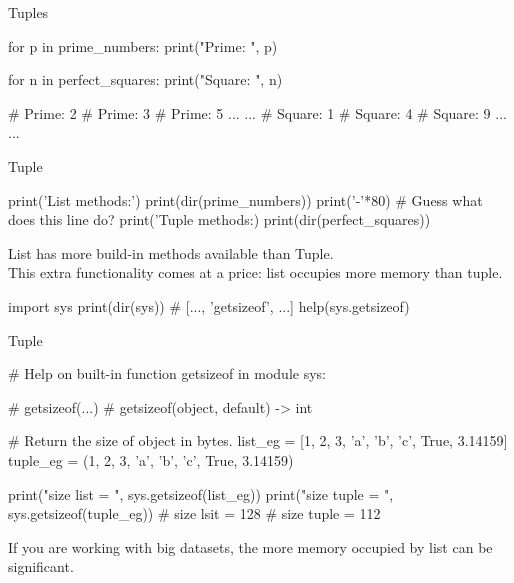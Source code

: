 \documentclass{beamer}
\begin{document}
\begin{frame}[fragile]{Tuples}
\begin{pythoncode}
for p in prime_numbers:
    print("Prime: ", p)

for n in perfect_squares:
    print("Square: ", n)

# Prime: 2
# Prime: 3
# Prime: 5
... ...
# Square: 1
# Square: 4
# Square: 9
... ...
\end{pythoncode}
\end{frame}

\begin{frame}[fragile]{Tuple}
\begin{pythoncode}
print('List methods:')
print(dir(prime_numbers))
print('-'*80)  # Guess what does this line do?
print('Tuple methods:)
print(dir(perfect_squares))
\end{pythoncode}
List has more build-in methods available than Tuple.\\
This extra functionality comes at a price: list occupies more
memory than tuple.\\
\begin{pythoncode}
import sys
print(dir(sys))
# [..., 'getsizeof', ...]
help(sys.getsizeof)
\end{pythoncode}
\end{frame}

\begin{frame}[fragile]{Tuple}
\begin{pythoncode}
# Help on built-in function getsizeof in module sys:

# getsizeof(...)
#     getsizeof(object, default) -> int
      
#     Return the size of object in bytes.
list_eg = [1, 2, 3, 'a', 'b', 'c', True, 3.14159]
tuple_eg = (1, 2, 3, 'a', 'b', 'c', True, 3.14159)

print("size list = ", sys.getsizeof(list_eg))
print("size tuple = ", sys.getsizeof(tuple_eg))
# size lsit = 128
# size tuple = 112
\end{pythoncode}
If you are working with big datasets, the more memory 
occupied by list can be significant.
\end{frame}
\end{document}
